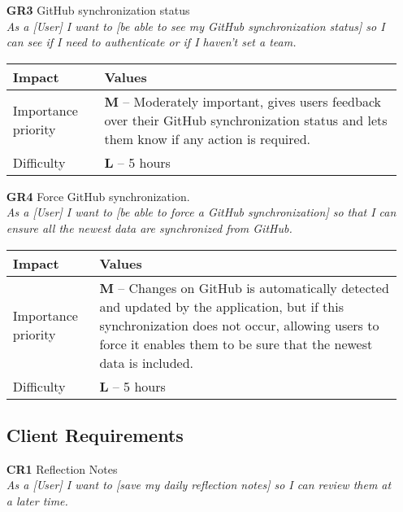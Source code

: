 \begin{itemize}
    \item[\textbf{GR3}] GitHub synchronization status \\
        \textit{\small{As a [User] I want to [be able to see my GitHub synchronization status] so I can see if I need to authenticate or if I haven't set a team.}}

        \begin{tabular}{| l | p{7cm} |}
            \hline
            \rowcolor[gray]{0.8}
            \textbf{Impact} & \textbf{Values} \\
            \hline
            Importance priority & \textbf{M} -- Moderately important, gives users feedback over their GitHub synchronization status and lets them know if any action is required.\\
            Difficulty & \textbf{L} -- 5 hours \\
            \hline
        \end{tabular}
    \vspace{0.5cm}

    \item[\textbf{GR4}] Force GitHub synchronization.\\
        \textit{\small{As a [User] I want to [be able to force a GitHub synchronization] so that I can ensure all the newest data are synchronized from GitHub.}}

        \begin{tabular}{| l | p{7cm} |}
            \hline
            \rowcolor[gray]{0.8}
            \textbf{Impact} & \textbf{Values} \\
            \hline
            Importance priority & \textbf{M} -- Changes on GitHub is automatically detected and updated by the application, but if this synchronization does not occur, allowing users to force it enables them to be sure that the newest data is included.\\
            Difficulty & \textbf{L} -- 5 hours \\
            \hline
        \end{tabular}
    \vspace{0.5cm}

\subsection{Client Requirements}
    \item[\textbf{CR1}] Reflection Notes\\
        \textit{\small{As a [User] I want to [save my daily reflection notes] so I can review them at a later time.}}


\end{itemize}
